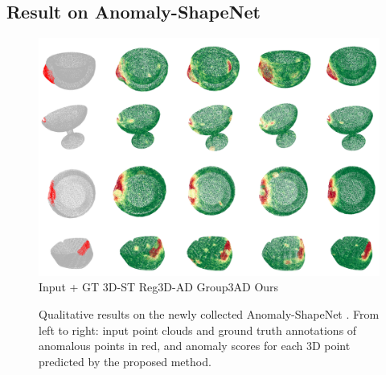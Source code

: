 \subsection{Result on Anomaly-ShapeNet}

\begin{figure}[!ht]
    \includegraphics[width=\linewidth]{figs/shapenet}  
    Input + GT \hspace{1.2cm} 3D-ST \cite{bergmann2023anomaly} \hspace{1.3cm} Reg3D-AD \cite{liu2023real3d} \hspace{1.5cm} Group3AD   \cite{zhu2024towards} \hspace{1.7cm} Ours \hspace{0.8cm}
    \caption{Qualitative results on the newly collected Anomaly-ShapeNet \cite{li2024towards}. From left to right: input point clouds and ground truth annotations of anomalous points in red, and anomaly scores for each 3D point predicted by the proposed method.}
    \label{fig:shapenet}
\end{figure}


